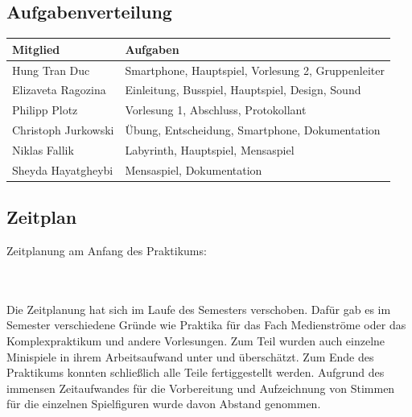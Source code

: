 \documentclass[a4paper, 11pt]{article} %
\begin{document}
\subsection{Aufgabenverteilung}
\begin{tabular}{|lp{9.0cm}|}
\hline 
\textbf{Mitglied} & \textbf{Aufgaben} \\ 
\hline 
Hung Tran Duc & Smartphone, Hauptspiel, Vorlesung 2, Gruppenleiter  \\ 
\hline
Elizaveta Ragozina & Einleitung, Busspiel, Hauptspiel, Design, Sound \\ 
\hline
Philipp Plotz & Vorlesung 1, Abschluss, Protokollant \\ 
\hline
Christoph Jurkowski & Übung, Entscheidung, Smartphone, Dokumentation \\ 
\hline
Niklas Fallik & Labyrinth, Hauptspiel, Mensaspiel \\ 
\hline
Sheyda Hayatgheybi & Mensaspiel, Dokumentation \\ 
\hline

\end{tabular} 

\subsection{Zeitplan}
Zeitplanung am Anfang des Praktikums:
\begin{figure}[ht]
\end{figure} \\\\
Die Zeitplanung hat sich im Laufe des Semesters verschoben. Dafür gab es im Semester verschiedene Gründe wie Praktika für das Fach Medienströme oder das Komplexpraktikum und andere Vorlesungen. Zum Teil wurden auch einzelne Minispiele in ihrem Arbeitsaufwand unter und überschätzt. Zum Ende des Praktikums konnten schließlich alle Teile fertiggestellt werden. Aufgrund des immensen Zeitaufwandes für die Vorbereitung und Aufzeichnung von Stimmen für die einzelnen Spielfiguren wurde davon Abstand genommen.
\end{document}
